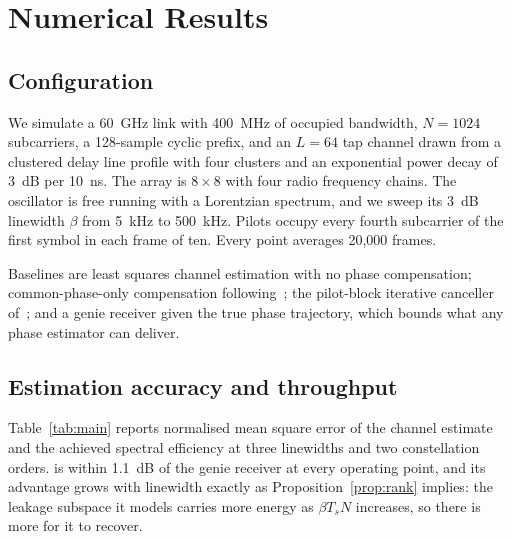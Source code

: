 \section{Numerical Results}
\label{sec:results}

\subsection{Configuration}

We simulate a 60~GHz link with 400~MHz of occupied bandwidth, $N = 1024$
subcarriers, a 128-sample cyclic prefix, and an $L = 64$ tap channel drawn from
a clustered delay line profile with four clusters and an exponential power
decay of 3~dB per 10~ns. The array is $8 \times 8$ with four radio frequency
chains. The oscillator is free running with a Lorentzian spectrum, and we sweep
its 3~dB linewidth $\beta$ from 5~kHz to 500~kHz. Pilots occupy every fourth
subcarrier of the first symbol in each frame of ten. Every point averages
20{,}000 frames.

Baselines are least squares channel estimation with no phase compensation;
common-phase-only compensation following~\citet{bertrand2018commonphase}; the
pilot-block iterative canceller of~\citet{eriksen2021iterative}; and a genie
receiver given the true phase trajectory, which bounds what any phase estimator
can deliver.

\subsection{Estimation accuracy and throughput}

Table~\ref{tab:main} reports normalised mean square error of the channel
estimate and the achieved spectral efficiency at three linewidths and two
constellation orders. \est{} is within 1.1~dB of the genie receiver at every
operating point, and its advantage grows with linewidth exactly as
Proposition~\ref{prop:rank} implies: the leakage subspace it models carries
more energy as $\beta T_s N$ increases, so there is more for it to recover.

